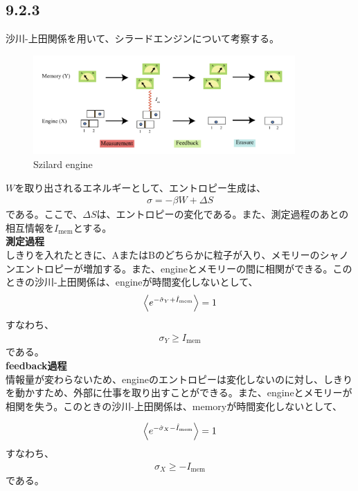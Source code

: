 \documentclass[a4paper,11pt]{jsarticle}
\numberwithin{equation}{section}
\begin{document}
\subsection*{9.2.3}
沙川-上田関係を用いて、シラードエンジンについて考察する。\\
\begin{figure}
    \begin{center}
    \includegraphics[width=100mm]{s.png}
    \end{center}
    \caption{Szilard engine}
    \label{fig:s}
\end{figure}

$W$を取り出されるエネルギーとして、エントロピー生成は、
\begin{align}
    \sigma = -\beta W + \Delta S
\end{align}
である。ここで、$\Delta S$は、エントロピーの変化である。また、測定過程のあとの相互情報を$I_{\text{mem}}$とする。\\
\textbf{測定過程}\\
しきりを入れたときに、AまたはBのどちらかに粒子が入り、メモリーのシャノンエントロピーが増加する。また、engineとメモリーの間に相関ができる。このときの沙川-上田関係は、engineが時間変化しないとして、
\begin{align}
    \ev{e^{-\hat{\sigma}_Y+\hat{I}_{\text{mem}}}} = 1
\end{align}
すなわち、
\begin{align}
    \sigma_Y \geq I_{\text{mem}}
\end{align}
である。\\

\textbf{feedback過程}\\
情報量が変わらないため、engineのエントロピーは変化しないのに対し、しきりを動かすため、外部に仕事を取り出すことができる。また、engineとメモリーが相関を失う。このときの沙川-上田関係は、memoryが時間変化しないとして、

\begin{align}
    \ev{e^{-\hat{\sigma}_X-\hat{I}_{\text{mem}}}} = 1
\end{align}
すなわち、
\begin{align}
    \sigma_X \geq -I_{\text{mem}}
\end{align}
である。\\
\end{document}
